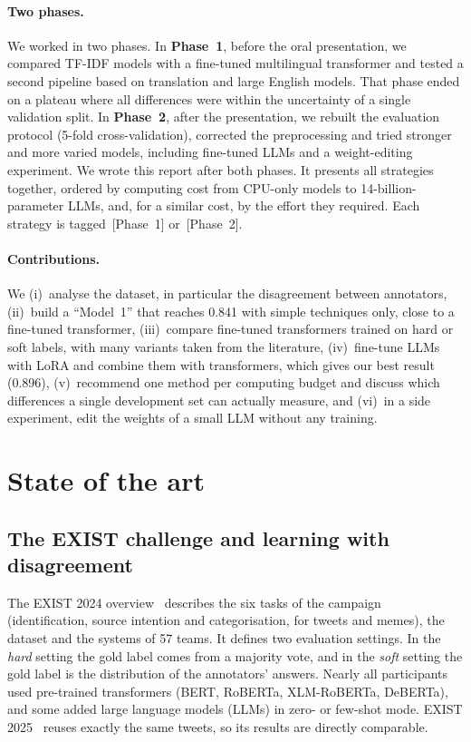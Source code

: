 \documentclass[pdflatex,sn-mathphys-num]{sn-jnl}
\newcommand{\Pone}{\,{\normalfont\textsf{\small[Phase~1]}}}
\newcommand{\Ptwo}{\,{\normalfont\textsf{\small[Phase~2]}}}
\begin{document}
\paragraph{Two phases.} We worked in two phases. In \textbf{Phase~1}, before the oral presentation, we compared TF-IDF models with a fine-tuned multilingual transformer and tested a second pipeline based on translation and large English models. That phase ended on a plateau where all differences were within the uncertainty of a single validation split. In \textbf{Phase~2}, after the presentation, we rebuilt the evaluation protocol (5-fold cross-validation), corrected the preprocessing and tried stronger and more varied models, including fine-tuned LLMs and a weight-editing experiment. We wrote this report after both phases. It presents all strategies together, ordered by computing cost from CPU-only models to 14-billion-parameter LLMs, and, for a similar cost, by the effort they required. Each strategy is tagged \Pone{} or \Ptwo.

\paragraph{Contributions.} We (i)~analyse the dataset, in particular the disagreement between annotators, (ii)~build a ``Model~1'' that reaches 0.841 with simple techniques only, close to a fine-tuned transformer, (iii)~compare fine-tuned transformers trained on hard or soft labels, with many variants taken from the literature, (iv)~fine-tune LLMs with LoRA and combine them with transformers, which gives our best result (0.896), (v)~recommend one method per computing budget and discuss which differences a single development set can actually measure, and (vi)~in a side experiment, edit the weights of a small LLM without any training.

\section{State of the art}\label{sec:sota}

\subsection{The EXIST challenge and learning with disagreement}

The EXIST 2024 overview~\cite{plaza2024exist} describes the six tasks of the campaign (identification, source intention and categorisation, for tweets and memes), the dataset and the systems of 57 teams. It defines two evaluation settings. In the \emph{hard} setting the gold label comes from a majority vote, and in the \emph{soft} setting the gold label is the distribution of the annotators' answers. Nearly all participants used pre-trained transformers (BERT, RoBERTa, XLM-RoBERTa, DeBERTa), and some added large language models (LLMs) in zero- or few-shot mode. EXIST 2025~\cite{plaza2025exist} reuses exactly the same tweets, so its results are directly comparable.
\end{document}
